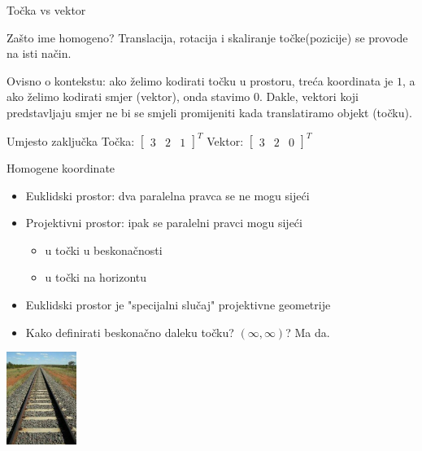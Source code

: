 \documentclass[9pt]{beamer}
\begin{document}
\begin{frame}{Točka vs vektor}
	\begin{block}{Zašto ime homogeno?}
		Translacija, rotacija i skaliranje točke(pozicije) se provode na isti način.
	\end{block}
	Ovisno o kontekstu: ako želimo kodirati točku u prostoru, treća koordinata je $1$, 
	a ako želimo kodirati smjer (vektor), onda stavimo $0$. Dakle, vektori koji predstavljaju smjer ne bi se smjeli promijeniti kada translatiramo objekt (točku). 
	\begin{block}{Umjesto zaključka}
		Točka: $\left[ \begin{array}{ccc} 3 & 2 & 1\end{array}\right]^T$  \quad
		Vektor: $\left[ \begin{array}{ccc} 3&2&0\end{array}\right]^T$
	\end{block}
\end{frame}

\begin{frame}{Homogene koordinate}
	\begin{itemize}
		\item Euklidski prostor: dva paralelna pravca se ne mogu sijeći
		\item Projektivni prostor: ipak se paralelni pravci mogu sijeći
		\begin{itemize}
			\item u točki u beskonačnosti
			\item u točki na horizontu
		\end{itemize} 
		\item Euklidski prostor je "specijalni slučaj" projektivne geometrije
		\item Kako definirati beskonačno daleku točku? $(\infty, \infty)$? Ma da.
	\end{itemize}
	\begin{center}
		\includegraphics[height=3cm]{slike/railroad2.jpg}
	\end{center}
\end{frame}
\end{document}
